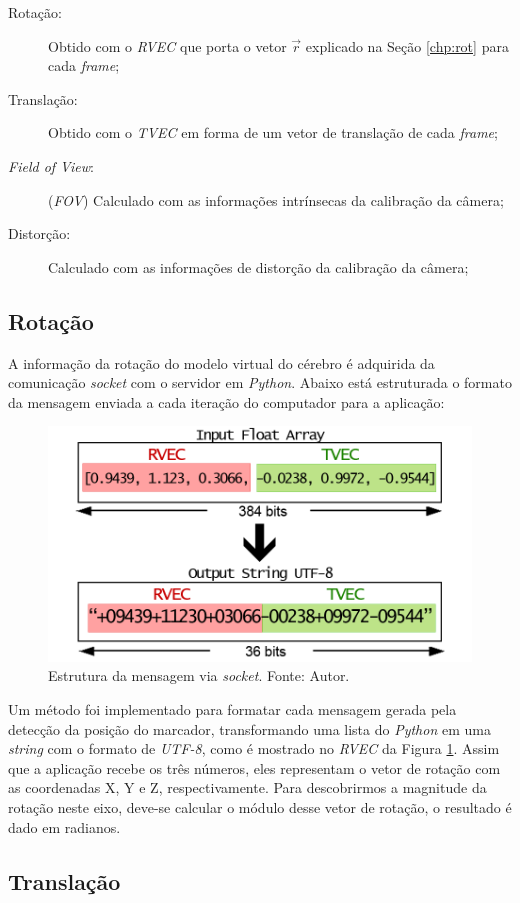 \begin{description}
    \item[Rotação:] Obtido com o \textit{RVEC} que porta o vetor \(\vec{r}\) explicado na Seção \ref{chp:rot} para cada \textit{frame};
    \item[Translação:] Obtido com o \textit{TVEC} em forma de um vetor de translação de cada \textit{frame};
    \item[\textit{Field of View}:] (\textit{FOV}) Calculado com as informações intrínsecas da calibração da câmera;
    \item[Distorção:] Calculado com as informações de distorção da calibração da câmera;
\end{description}

\subsection{Rotação}

A informação da rotação do modelo virtual do cérebro é adquirida da comunicação \textit{socket} com o servidor em \textit{Python}. Abaixo está estruturada o formato da mensagem enviada a cada iteração do computador para a aplicação:

\begin{figure}[ht]
    \centering
    \includegraphics[width=.55\textwidth]{figuras/format rodrigues.png}
    \caption{Estrutura da mensagem via \textit{socket}. Fonte: Autor.}
    \label{fig:frodrigues}
\end{figure}

Um método foi implementado para formatar cada mensagem gerada pela detecção da posição do marcador, transformando uma lista do \textit{Python} em uma \textit{string} com o formato de \textit{UTF-8}, como é mostrado no \textit{RVEC} da Figura \ref{fig:frodrigues}. Assim que a aplicação recebe os três números, eles representam o vetor de rotação com as coordenadas X, Y e Z, respectivamente. Para descobrirmos a magnitude da rotação neste eixo, deve-se calcular o módulo desse vetor de rotação, o resultado é dado em radianos.

\subsection{Translação}


